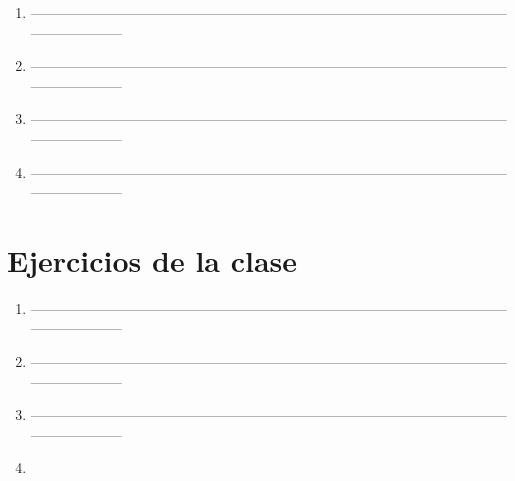 \documentclass[12pt]{article}
\theoremstyle{definition}
\theoremstyle{remark}
\begin{document}
\begin{enumerate}
--------------------------------------------------------------------------------------------------------------------------
    \item  
    
--------------------------------------------------------------------------------------------------------------------------
    \item 
    
--------------------------------------------------------------------------------------------------------------------------
    \item 
    
--------------------------------------------------------------------------------------------------------------------------
    \item 
    
--------------------------------------------------------------------------------------------------------------------------
\end{enumerate}


\section*{Ejercicios de la clase}
\begin{enumerate}
    \item 
    
--------------------------------------------------------------------------------------------------------------------------
    \item 
    
--------------------------------------------------------------------------------------------------------------------------
    \item 
    
--------------------------------------------------------------------------------------------------------------------------
    \item 

\end{enumerate}
\end{document}

